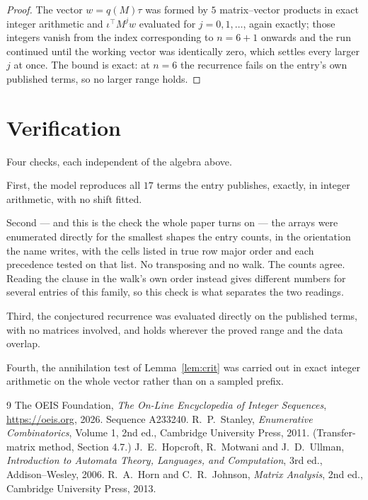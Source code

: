 \documentclass[11pt,a4paper]{article}
\theoremstyle{plain}
\theoremstyle{definition}
\begin{document}
\begin{proof}
The vector $w=q(M)\tau$ was formed by $5$ matrix--vector products in exact integer
arithmetic and $\iota^{\!\top}M^{j}w$ evaluated for $j=0,1,\dots$, again exactly; those
integers vanish from the index corresponding to $n=6+1$ onwards and the run continued
until the working vector was identically zero, which settles every larger $j$ at once. The bound is exact: at $n=6$ the recurrence fails on the entry's own published terms, so no larger range holds.
\end{proof}

\section{Verification}

Four checks, each independent of the algebra above.

First, the model reproduces all $17$ terms the entry publishes, exactly, in integer
arithmetic, with no shift fitted.

Second --- and this is the check the whole paper turns on --- the arrays were enumerated
directly for the smallest shapes the entry counts, in the orientation the name writes, with the
cells listed in true row major order and each precedence tested on that list. No transposing
and no walk. The counts agree. Reading the clause in the walk's own order instead gives
different numbers for several entries of this family, so this check is what separates the two
readings.

Third, the conjectured recurrence was evaluated directly on the published terms, with no
matrices involved, and holds wherever the proved range and the data overlap.

Fourth, the annihilation test of Lemma~\ref{lem:crit} was carried out in exact integer
arithmetic on the whole vector rather than on a sampled prefix.

\begin{thebibliography}{9}
 The OEIS Foundation, \emph{The On-Line Encyclopedia of Integer
Sequences}, \url{https://oeis.org}, 2026. Sequence A233240.
 R.~P.~Stanley, \emph{Enumerative Combinatorics}, Volume 1, 2nd ed.,
Cambridge University Press, 2011. (Transfer-matrix method, Section 4.7.)
 J.~E.~Hopcroft, R.~Motwani and J.~D.~Ullman, \emph{Introduction to
Automata Theory, Languages, and Computation}, 3rd ed., Addison--Wesley, 2006.
 R.~A.~Horn and C.~R.~Johnson, \emph{Matrix Analysis}, 2nd ed., Cambridge
University Press, 2013.
\end{thebibliography}
\end{document}

